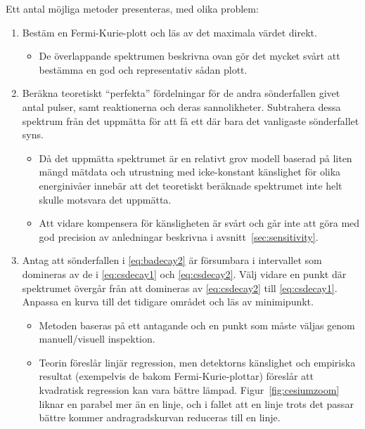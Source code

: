 Ett antal möjliga metoder presenteras, med olika problem:
%
\begin{enumerate}
    \item Bestäm en Fermi-Kurie-plott och läs av det maximala värdet direkt.
    \begin{itemize}
        \item De överlappande spektrumen beskrivna ovan gör det mycket svårt
        att bestämma en god och representativ sådan plott.
    \end{itemize}

    \item Beräkna teoretiskt ``perfekta'' fördelningar för de andra
    sönderfallen givet antal pulser, samt reaktionerna och deras sannolikheter.
    Subtrahera dessa spektrum från det uppmätta för att få ett där bara det
    vanligaste sönderfallet syns.
    \begin{itemize}
        \item Då det uppmätta spektrumet är en relativt grov modell baserad på
        liten mängd mätdata och utrustning med icke-konstant känslighet för
        olika energinivåer innebär att det teoretiskt beräknade spektrumet inte
        helt skulle motsvara det uppmätta.

        \item Att vidare kompensera för känsligheten är svårt och går inte att
        göra med god precision av anledningar beskrivna i
        avsnitt~\ref{sec:sensitivity}.
    \end{itemize}

    \item Antag att sönderfallen i \eqref{eq:badecay2} är försumbara i
    intervallet som domineras av de i \eqref{eq:csdecay1} och
    \eqref{eq:csdecay2}. Välj vidare en punkt där spektrumet övergår från att
    domineras av \eqref{eq:csdecay2} till \eqref{eq:csdecay1}. Anpassa en kurva
    till det tidigare området och läs av minimipunkt.
    \begin{itemize}
        \item Metoden baseras på ett antagande och en punkt som måste väljas
        genom manuell/visuell inspektion.

        \item Teorin föreslår linjär regression, men detektorns känslighet och
        empiriska resultat (exempelvis de bakom Fermi-Kurie-plottar) föreslår
        att kvadratisk regression kan vara bättre lämpad.
        Figur~\ref{fig:cesiumzoom} liknar en parabel mer än en linje, och i
        fallet att en linje trots det passar bättre kommer andragradskurvan
        reduceras till en linje.
    \end{itemize}
\end{enumerate}

